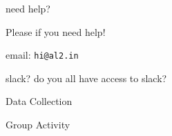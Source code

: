 \documentclass[aspectratio=43,17pt]{beamer} %
\begin{document}
\begin{frame}{need help?}

Please  if you need help!

email: \texttt{hi@al2.in}

slack? do you all have access to slack?


\end{frame}


\begin{frame}[standout]

{Data Collection}

\end{frame}


\begin{frame}[standout]
    
Group Activity

\end{frame}
\end{document}
